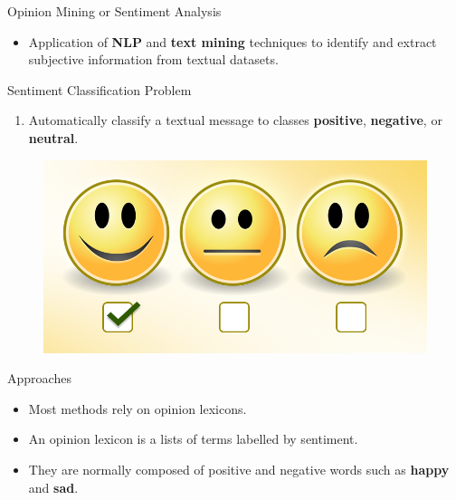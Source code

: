 \documentclass[handout]{beamer}
\begin{document}
\begin{frame}{Opinion Mining or Sentiment Analysis}
\begin{scriptsize}\begin{itemize}
 \item Application of \textbf{NLP} and \textbf{text mining} techniques to identify and extract subjective information from textual datasets.
\end{itemize}
\pause
\begin{block}{Sentiment Classification Problem}
  \begin{enumerate}
   \item Automatically classify a textual message to classes \textcolor[rgb]{0.00,0.00,1.00}{\textbf{positive}}, \textcolor[rgb]{1.00,0.00,0.00}{\textbf{negative}}, or \textcolor[rgb]{0.00,1.00,0.00}{\textbf{neutral}}. 
  \end{enumerate} 
\end{block}

  \begin{figure}[h]
        	\includegraphics[scale = 0.15]{pics/sent.png}
        \end{figure}


\begin{block}{Approaches}
\begin{itemize}
\item Most methods rely on opinion lexicons.
\item An opinion lexicon is a lists of terms labelled by sentiment.
\item They are normally composed of positive and negative words such as \textcolor[rgb]{0.00,0.00,1.00}{\textbf{happy}} and \textcolor[rgb]{1.00,0.00,0.00}{\textbf{sad}}.
\end{itemize}

\end{block}

\end{scriptsize}

\end{frame}
\end{document}
